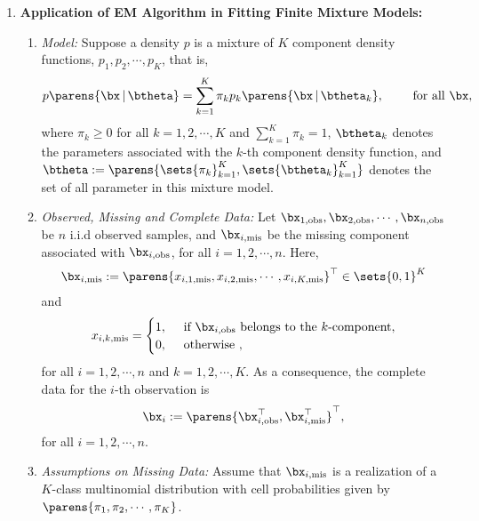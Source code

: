 \documentclass[12pt]{article}
\begin{document}
\begin{enumerate}[label=\textbf{\arabic*.}]
	\item \textbf{Application of EM Algorithm in Fitting Finite Mixture Models:} 
	\begin{enumerate}
		\item \textit{Model:} Suppose a density $p$ is a mixture of $K$ component density functions, $p_1, p_2, \cdots, p_K$, that is, 
		\begin{align*}
			p \parens{\bx \,\vert\, \btheta} = \sum_{k=1}^K \pi_k p_k \parens{\bx \,\vert\, \btheta_k}, \qquad \text{ for all } \bx, 
		\end{align*}
		where $\pi_k \ge 0$ for all $k = 1, 2, \cdots, K$ and $\sum_{k=1}^K \pi_k = 1$, $\btheta_k$ denotes the parameters associated with the $k$-th component density function, and $\btheta := \parens{\sets{\pi_k}_{k=1}^K, \sets{\btheta_k}_{k=1}^K}$ denotes the set of all parameter in this mixture model. 
		
		\item \textit{Observed, Missing and Complete Data:} Let $\bx_{1, \mathrm{obs}}, \bx_{2, \mathrm{obs}}, \cdots, \bx_{n, \mathrm{obs}}$ be $n$ i.i.d observed samples, and $\bx_{i, \mathrm{mis}}$ be the missing component associated with $\bx_{i, \mathrm{obs}}$, for all $i = 1, 2, \cdots, n$. Here, 
		\begin{align*}
			\bx_{i, \mathrm{mis}} := \parens{x_{i, 1, \mathrm{mis}}, x_{i, 2, \mathrm{mis}}, \cdots, x_{i, K, \mathrm{mis}}}^\top \in \sets{0, 1}^K
		\end{align*}
		and 
		\begin{align*}
			x_{i, k, \mathrm{mis}} = \begin{cases}
				1, & \, \text{ if } \bx_{i, \mathrm{obs}} \text{ belongs to the $k$-component}, \\ 
				0, & \, \text{ otherwise }, 
			\end{cases}
		\end{align*}
		for all $i = 1, 2, \cdots, n$ and $k = 1, 2, \cdots, K$. As a consequence, the complete data for the $i$-th observation is 
		\begin{align*}
			\bx_i := \parens{\bx_{i, \mathrm{obs}}^\top, \bx_{i, \mathrm{mis}}^\top}^\top, 
		\end{align*}
		for all $i = 1, 2, \cdots, n$. 
		
		\item \textit{Assumptions on Missing Data:} Assume that $\bx_{i, \mathrm{mis}}$ is a realization of a $K$-class multinomial distribution with cell probabilities given by $\parens{\pi_1, \pi_2, \cdots, \pi_K}$. 
		

\end{enumerate}
\end{enumerate}
\end{document}
